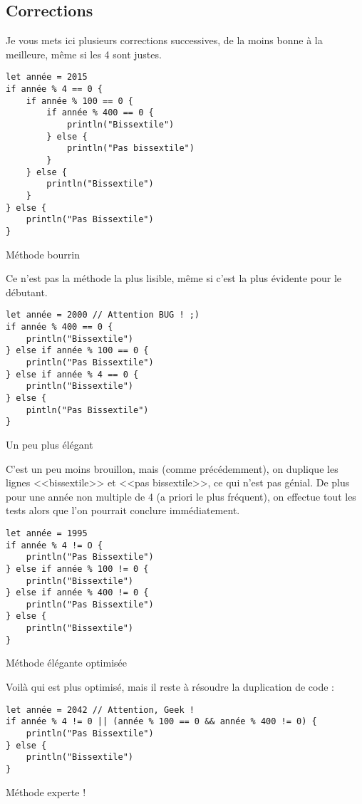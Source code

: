 \subsection{Corrections}
Je vous mets ici plusieurs corrections successives,
de la moins bonne à la meilleure, même si les 4 sont justes.

\begin{listing}[h!]
\begin{verbatim}
let année = 2015
if année % 4 == 0 {
    if année % 100 == 0 {
        if année % 400 == 0 {
            println("Bissextile")
        } else {
            println("Pas bissextile")
        }
    } else {
        println("Bissextile")
    }
} else {
    println("Pas Bissextile")
}
\end{verbatim}
\caption{Méthode bourrin}
\end{listing}
Ce n'est pas la méthode la plus lisible,
même si c'est la plus évidente pour le débutant.

\begin{listing}[h!]
\begin{verbatim}
let année = 2000 // Attention BUG ! ;)
if année % 400 == 0 {
    println("Bissextile")
} else if année % 100 == 0 {
    println("Pas Bissextile")
} else if année % 4 == 0 {
    println("Bissextile")
} else {
    pintln("Pas Bissextile")
}
\end{verbatim}
\caption{Un peu plus élégant}
\end{listing}
C'est un peu moins brouillon, mais (comme précédemment), on duplique les lignes <<bissextile>> et <<pas bissextile>>, ce qui n'est pas génial. De plus pour une année non multiple de 4 (a priori le plus fréquent), on effectue tout les tests alors que l'on pourrait conclure immédiatement.

\begin{listing}[h!]
\begin{verbatim}
let année = 1995
if année % 4 != O {
    println("Pas Bissextile")
} else if année % 100 != 0 {
    println("Bissextile")
} else if année % 400 != 0 {
    println("Pas Bissextile")
} else {
    println("Bissextile")
}
\end{verbatim}
\caption{Méthode élégante optimisée}
\end{listing}
Voilà qui est plus optimisé, mais il reste à résoudre la duplication de code :

\begin{listing}[h!]
\begin{verbatim}
let année = 2042 // Attention, Geek !
if année % 4 != 0 || (année % 100 == 0 && année % 400 != 0) {
    println("Pas Bissextile")
} else {
    println("Bissextile")
}
\end{verbatim}
\caption{Méthode experte !}
\end{listing}

